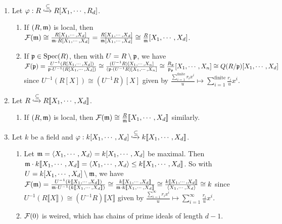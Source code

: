 \begin{example}
    \begin{enumerate}
        \item Let $\varphi: R \xhookrightarrow \subseteq R[X_1,\cdots,R_d]$.
            \begin{enumerate}
                \item If $(R,\mathfrak{m})$ is local, then $\mathcal{F}(\mathfrak{m}) \cong \frac{R[X_1,\cdots,X_d]}{\mathfrak{m} \cdot R[X_1,\cdots,X_d]} = \frac{R[X_1,\cdots,X_d]}{\mathfrak{m} [X_1,\cdots,X_d]} \cong \frac{R}{\mathfrak{m}}[X_1,\cdots,X_d]$.
                \item If $\mathfrak{p} \in \operatorname{Spec}(R)$, then with $U = R \setminus \mathfrak{p}$, we have $\mathcal{F}(\mathfrak{p}) = \frac{U^{-1}(R[X_1,\cdots,X_d])}{\mathfrak{p} \cdot U^{-1}(R[X_1,\cdots,X_d])} \cong \frac{(U^{-1}R)[X_1,\cdots,X_n]}{(\mathfrak{p} \cdot (U^{-1}R)[X_1,\cdots,X_n]} \cong \frac{R_{\mathfrak{p}}}{\mathfrak{p}_{\mathfrak{p}}}[X_1,\cdots,X_n] \cong Q(R/\mathfrak{p})[X_1,\cdots,X_d]$ since $U^{-1}(R[X]) \cong (U^{-1}R)[X]$ given by $\frac{\sum_{i=1}^{\text{finite}}r_ix^{i}}{u} \mapsto \sum_{i=1}^{\text{finite}}\frac{r_i}{u}x^{i}$.
            \end{enumerate}
        \item 
            Let $R \xhookrightarrow{\subseteq} R\llbracket X_1,\cdots,X_d \rrbracket$.
            \begin{enumerate}
                \item If $(R,\mathfrak{m})$ is local, then $\mathcal{F}(\mathfrak{m}) \cong \frac{R}{\mathfrak{m}}\llbracket X_1,\cdots,X_d \rrbracket$ similarly.
            \end{enumerate}
        \item
            Let $k$ be a field and $\varphi: k[X_1,\cdots,X_d] \xhookrightarrow{\subseteq} k\llbracket X_1,\cdots,X_d \rrbracket$.
            \begin{enumerate}
                \item Let $\mathfrak{m} = \langle X_1,\cdots,X_d \rangle = k[X_1,\cdots,X_d]$ be maximal. Then $\mathfrak{m} \cdot k\llbracket X_1,\cdots,X_d \rrbracket = \langle X_1,\cdots,X_d \rangle \leq k\llbracket X_1,\cdots,X_d \rrbracket$. So with $U = k[X_1,\cdots,X_d] \setminus \mathfrak{m}$, we have $\mathcal{F}(\mathfrak{m}) = \frac{U^{-1}(k\llbracket X_1,\cdots,X_d \rrbracket)}{\mathfrak{m} \cdot U^{-1}(k\llbracket X_1,\cdots,X_d \rrbracket)} \cong \frac{k\llbracket X_1,\cdots,X_d \rrbracket}{\mathfrak{m} \cdot k\llbracket X_1,\cdots,X_d \rrbracket} \cong \frac{k\llbracket X_1,\cdots,X_d \rrbracket}{\langle X_1,\cdots,X_d \rangle} \cong k$ since $U^{-1}(R\llbracket X \rrbracket) \cong (U^{-1}R)\llbracket X \rrbracket $ given by $\frac{\sum_{i=1}^{\infty}r_ix^{i}}{u} \mapsto \sum_{i=1}^{\infty}\frac{r_i}{u}x^{i}$.
                \item $\mathcal{F}(0)$ is weired, which has chains of prime ideals of length $d-1$.
            \end{enumerate}
    \end{enumerate}
\end{example}
